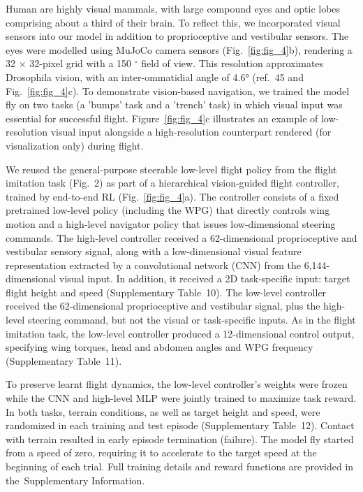 \documentclass[sn-mathphys-num]{sn-jnl}%
\theoremstyle{thmstyleone}%
\theoremstyle{thmstyletwo}%
\theoremstyle{thmstylethree}%
\begin{document}
Human are highly visual mammals, with large compound eyes and optic lobes comprising about a third of their brain. 
To reflect this, we incorporated visual sensors into our model in addition to proprioceptive and vestibular sensors. 
The eyes were modelled using MuJoCo camera sensors (Fig.~\ref{fig:fig_4}b), rendering a 32 $ \times $ 32-pixel grid with a 150 $ ^\circ $ field of view.
This resolution approximates Drosophila vision, with an inter-ommatidial angle of 4.6° (ref.~\cite{zhao2025eye}45 and Fig.~\ref{fig:fig_4}c). 
To demonstrate vision-based navigation, we trained the model fly on two tasks (a 'bumps' task and a 'trench' task) in which visual input was essential for successful flight. 
Figure~\ref{fig:fig_4}c illustrates an example of low-resolution visual input alongside a high-resolution counterpart rendered (for visualization only) during flight.


We reused the general-purpose steerable low-level flight policy from the flight imitation task (Fig. 2) as part of a hierarchical vision-guided flight controller, trained by end-to-end RL (Fig.~\ref{fig:fig_4}a). 
The controller consists of a fixed pretrained low-level policy (including the WPG) that directly controls wing motion and a high-level navigator policy that issues low-dimensional steering commands. 
The high-level controller received a 62-dimensional proprioceptive and vestibular sensory signal, along with a low-dimensional visual feature representation extracted by a convolutional network (CNN) from the 6,144-dimensional visual input. 
In addition, it received a 2D task-specific input: target flight height and speed (Supplementary Table 10). 
The low-level controller received the 62-dimensional proprioceptive and vestibular signal, plus the high-level steering command, but not the visual or task-specific inputs. 
As in the flight imitation task, the low-level controller produced a 12-dimensional control output, specifying wing torques, head and abdomen angles and WPG frequency (Supplementary Table 11).



To preserve learnt flight dynamics, the low-level controller's weights were frozen while the CNN and high-level MLP were jointly trained to maximize task reward. 
In both tasks, terrain conditions, as well as target height and speed, were randomized in each training and test episode (Supplementary Table 12). 
Contact with terrain resulted in early episode termination (failure). 
The model fly started from a speed of zero, requiring it to accelerate to the target speed at the beginning of each trial. 
Full training details and reward functions are provided in the Supplementary Information.
\end{document}
